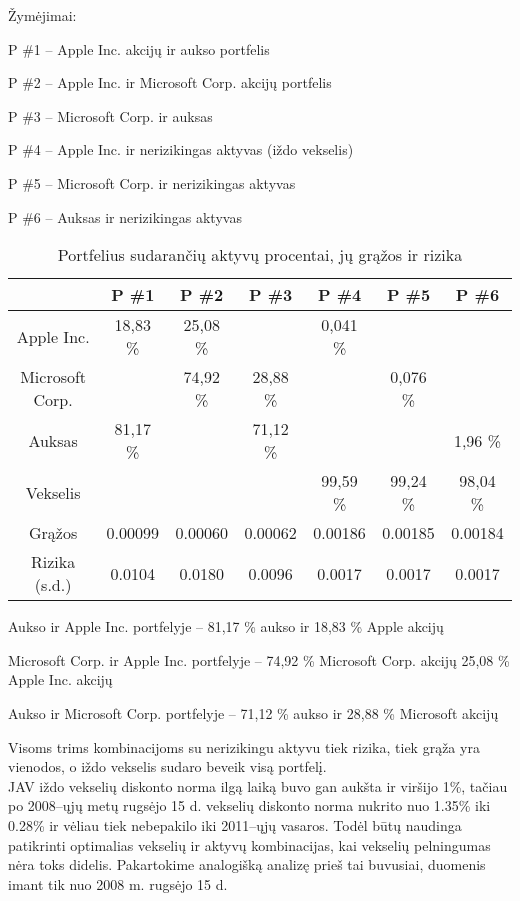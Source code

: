 \documentclass[12pt, a14paper, lithuanian]{article}
\begin{document}
Žymėjimai:

P \#1 -- Apple Inc. akcijų ir aukso portfelis

P \#2 -- Apple Inc. ir Microsoft Corp. akcijų portfelis

P \#3 -- Microsoft Corp. ir auksas

P \#4 -- Apple Inc. ir nerizikingas aktyvas (iždo vekselis)

P \#5 -- Microsoft Corp. ir nerizikingas aktyvas

P \#6 -- Auksas ir nerizikingas aktyvas

\begin{table}[ht]
\begin{center}
\begin{tabular}{ccccccc}
  \hline
 & P \#1 & P \#2 & P \#3 & P \#4 & P \#5 & P \#6 \\ 
  \hline
Apple Inc. & 18,83 \% & 25,08 \% &  & 0,041 \%  & & &\\
\hline
 Microsoft Corp. &  & 74,92 \% & 28,88 \% & & 0,076 \% & & \\ 
   \hline
   Auksas & 81,17 \% & & 71,12 \% & & & 1,96 \% & \\
   \hline
   Vekselis & & & & 99,59 \% & 99,24 \% & 98,04 \% & \\
   \hline
   Grąžos & 0.00099 & 0.00060 & 0.00062 & 0.00186 & 0.00185 & 0.00184 &\\
   \hline
   Rizika (s.d.) & 0.0104 & 0.0180 & 0.0096 & 0.0017 & 0.0017 & 0.0017 &\\
   \hline
\end{tabular}
\end{center}
\caption{Portfelius sudarančių aktyvų procentai, jų grąžos ir rizika}
\end{table}

Aukso ir Apple Inc. portfelyje -- 81,17 \% aukso ir 18,83 \% Apple akcijų

Microsoft Corp. ir Apple Inc. portfelyje -- 74,92 \% Microsoft Corp. akcijų  25,08 \% Apple Inc. akcijų

Aukso ir Microsoft Corp. portfelyje -- 71,12 \% aukso ir 28,88 \% Microsoft akcijų

Visoms trims kombinacijoms su nerizikingu aktyvu tiek rizika, tiek grąža yra vienodos, o iždo vekselis sudaro beveik visą portfelį. \\



JAV iždo vekselių diskonto norma ilgą laiką buvo gan aukšta ir viršijo 1\%, tačiau
po 2008--ųjų metų rugsėjo 15 d. vekselių diskonto norma nukrito nuo 1.35\% iki 0.28\% ir vėliau tiek nebepakilo iki 2011--ųjų
vasaros. Todėl būtų naudinga patikrinti optimalias vekselių ir aktyvų kombinacijas, kai vekselių pelningumas
nėra toks didelis. Pakartokime analogišką analizę prieš tai buvusiai, duomenis imant tik nuo 2008 m. rugsėjo 15 d. 
\end{document}
